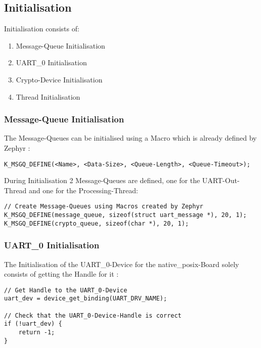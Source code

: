 \pagebreak

\subsection{Initialisation}

Initialisation consists of:
\begin{enumerate}
	\item Message-Queue Initialisation
	\item UART\_0 Initialisation
	\item Crypto-Device Initialisation
	\item Thread Initialisation
\end{enumerate}

\subsubsection{Message-Queue Initialisation}

The Message-Queues can be initialised using a Macro which
is already defined by Zephyr :
\\
\begin{lstlisting}[style=CStyle, caption=Message Queue Initialisation]
K_MSGQ_DEFINE(<Name>, <Data-Size>, <Queue-Length>, <Queue-Timeout>);
\end{lstlisting}
During Initialisation 2 Message-Queues are defined, one for
the UART-Out-Thread and one for the Processing-Thread:
\\
\begin{lstlisting}[style=CStyle]
// Create Message-Queues using Macros created by Zephyr
K_MSGQ_DEFINE(message_queue, sizeof(struct uart_message *), 20, 1);
K_MSGQ_DEFINE(crypto_queue, sizeof(char *), 20, 1);
\end{lstlisting}

\subsubsection{UART\_0 Initialisation}

The Initialisation of the UART\_0-Device for the native\_posix-Board
solely consists of getting the Handle for it :
\\
\begin{lstlisting}[style=CStyle,caption=UART 0 Initialisation]
// Get Handle to the UART_0-Device
uart_dev = device_get_binding(UART_DRV_NAME);

// Check that the UART_0-Device-Handle is correct
if (!uart_dev) {
	return -1;
}
\end{lstlisting}

